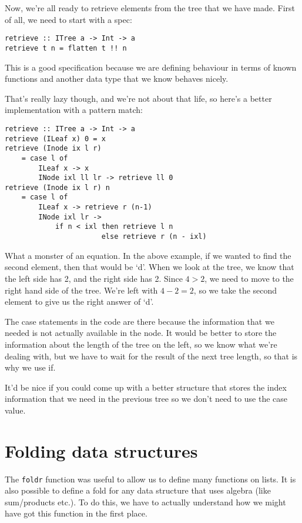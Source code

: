 \documentclass[11pt,a4paper,titlepage,dvipsnames,cmyk]{scrartcl}
\begin{document}
Now, we're all ready to retrieve elements from the tree that we have made.
First of all, we need to start with a spec:
\begin{lstlisting}[style=B]
retrieve :: ITree a -> Int -> a
retrieve t n = flatten t !! n
\end{lstlisting}
This is a good specification because we are defining behaviour in terms of
known functions and another data type that we know behaves nicely.

That's really lazy though, and we're not about that life, so here's a
better implementation with a pattern match:

\begin{lstlisting}[style=B]
retrieve :: ITree a -> Int -> a
retrieve (ILeaf x) 0 = x
retrieve (Inode ix l r)
    = case l of
        ILeaf x -> x
        INode ixl ll lr -> retrieve ll 0
retrieve (Inode ix l r) n
    = case l of
        ILeaf x -> retrieve r (n-1)
        INode ixl lr ->
            if n < ixl then retrieve l n
                       else retrieve r (n - ixl)
\end{lstlisting}

What a monster of an equation. In the above example, if we wanted to find
the second element, then that would be `d'. When we look at the tree, we
know that the left side has 2, and the right side has 2. Since $4 > 2$, we
need to move to the right hand side of the tree. We're left with $4 - 2 =
2$, so we take the second element to give us the right answer of `d'.

The case statements in the code are there because the information that we
needed is not actually available in the node. It would be better to store
the information about the length of the tree on the left, so we know what
we're dealing with, but we have to wait for the result of the next tree
length, so that is why we use if.

It'd be nice if you could come up with a better structure that stores the
index information that we need in the previous tree so we don't need to
use the case value.

\section{Folding data structures}%
\label{sec:folding}
The \lstinline|foldr| function was useful to allow us to define many
functions on lists. It is also possible to define a fold for any data
structure that uses algebra (like sum/products etc.). To do this, we have
to actually understand how we might have got this function in the first
place.
\end{document}
